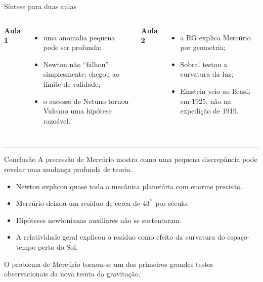 \documentclass[aspectratio=169,10pt]{beamer}
\newcommand{\arcsec}{^{\prime\prime}}
\newcommand{\goldline}{%
  {\color{MercuryAccent}\rule{0.32\paperwidth}{0.45pt}}%
}
\begin{document}
\begin{frame}{Síntese para duas aulas}
  \begin{columns}[T,onlytextwidth]
    {\color{MercuryAccent}\textbf{Aula 1}}
    \vspace{0.2cm}
    \begin{itemize}
      \item uma anomalia pequena pode ser profunda;
      \item Newton não ``falhou'' simplesmente: chegou ao limite de validade;
      \item o sucesso de Netuno tornou Vulcano uma hipótese razoável.
    \end{itemize}

    {\color{MercuryAccent}\textbf{Aula 2}}
    \vspace{0.2cm}
    \begin{itemize}
      \item a RG explica Mercúrio por geometria;
      \item Sobral testou a curvatura da luz;
      \item Einstein veio ao Brasil em 1925, não na expedição de 1919.
    \end{itemize}
  \end{columns}

  \vspace{0.4cm}
  \centering
  \goldline
\end{frame}

\begin{frame}{Conclusão}
  A precessão de Mercúrio mostra como uma pequena discrepância pode revelar uma mudança profunda de teoria.

  \vspace{0.35cm}
  \begin{itemize}
    \item Newton explicou quase toda a mecânica planetária com enorme precisão.
    \item Mercúrio deixou um resíduo de cerca de $43\arcsec$ por século.
    \item Hipóteses newtonianas auxiliares não se sustentaram.
    \item A relatividade geral explicou o resíduo como efeito da curvatura do espaço-tempo perto do Sol.
  \end{itemize}

  \vspace{0.35cm}
  O problema de Mercúrio tornou-se um dos primeiros grandes testes observacionais da nova teoria da gravitação.
\end{frame}
\end{document}
